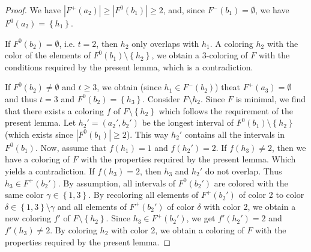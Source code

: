 \documentclass[12pt]{article}
\theoremstyle{definition}
\begin{document}
\begin{proof}
        We have $\left|F^{+}\left(a_{2}\right)\right| \geq
        \left|F^{0}\left(b_1\right)\right| \geq 2$,
        and, since $F^{-}\left(b_1\right) = \emptyset$,
        we have $F^{0}\left(a_2\right)
        = \left\{h_1\right\}$.
        
        If $F^{0}\left(b_2\right) = \emptyset$,
        i.e. $t=2$, then $h_2$
        only overlaps with $h_1$.
        A coloring $h_2$ with the color
        of the elements of $F^{0}\left(b_1\right)
        \setminus \left\{h_2\right\}$,
        we obtain a 3-coloring of $F$ with
        the conditions required by
        the present lemma, which is a
        contradiction.
        
        If $F^{0}\left(b_2\right) \neq \emptyset$
        and $t \geq 3$,
        we obtain (since $h_1 \in
        F^{-}\left(b_2\right)$)
        theat $F^{+}\left(a_3\right)=\emptyset$ 
        and thus $t=3$
        and $F^{0}\left(b_2\right) = \left\{h_3\right\}$.
        Consider $F \setminus h_2$.
        Since $F$ is minimal,
        we find that there exists
        a coloring $f$ of $F \setminus \left\{h_2\right\}$
        which follows the requirement
        of the present lemma.
        Let $h_2' = \left(a_2', b_2'\right)$
        be the longest interval of 
        $F^{0}\left(b_1\right) \setminus \left\{h_2\right\}$
        (which exists since $\left|F^{0}\left(b_1\right)\right|
        \geq 2$). This way
        $h_2'$ contains all
        the intervals in
        $F^{0}\left(b_1\right)$.
        Now, assume that $f\left(h_1\right) = 1$
        and $f\left(h_2'\right) = 2$.
        If $f\left(h_3\right)\neq 2$,
        then we have a coloring 
        of $F$ with the properties
        required by the present lemma.
        Which yields a contradiction.
        If $f\left(h_3\right) = 2$,
        then $h_3$ and $h_2'$
        do not overlap. Thus $h_3 \in F^{+}\left(b_2'\right)$.
        By assumption, all intervals
        of $F^{0}\left(b_2'\right)$ 
        are colored with the same color
        $\gamma \in \left\{1,3\right\}$.
        By recoloring all elements
        of $F^{+}\left(b_2'\right)$
        of color 2 to color 
        $\delta \in \left\{1,3\right\}
        \setminus \gamma$
        and all elements of $F^{+}\left(b_2'\right)$ 
        of color $\delta$ with color 2,
        we obtain a 
        new coloring $f'$ of 
        $F \setminus \left\{h_2\right\}$.  Since $h_3 \in F^{+}\left(b_2'\right)$,
         we get
        $f'\left(h_2'\right)=2$ and
        $f'\left(h_3\right) \neq 2$.
        By coloring $h_2$ with
        color 2, we obtain a coloring
        of $F$ with the properties
        required by the present lemma.
    \end{proof}
    
\end{document}
